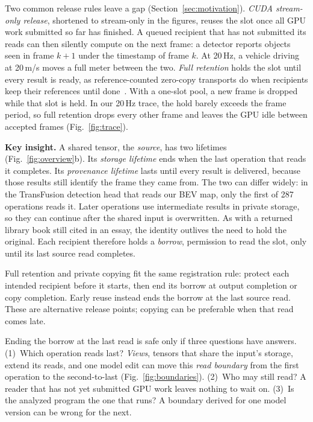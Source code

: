 \documentclass[conference]{IEEEtran}
\newcommand{\Hz}{\,Hz}
\begin{document}
Two common release rules leave a gap (Section~\ref{sec:motivation}). \emph{CUDA stream-only release}, shortened to stream-only in the figures, reuses the slot once all GPU work submitted so far has finished. A queued recipient that has not submitted its reads can then silently compute on the next frame: a detector reports objects seen in frame $k{+}1$ under the timestamp of frame $k$. At 20\Hz, a vehicle driving at 20\,m/s moves a full meter between the two. \emph{Full retention} holds the slot until every result is ready, as reference-counted zero-copy transports do when recipients keep their references until done~\cite{iceoryx,agnocast}. With a one-slot pool, a new frame is dropped while that slot is held. In our 20\Hz{} trace, the hold barely exceeds the frame period, so full retention drops every other frame and leaves the GPU idle between accepted frames (Fig.~\ref{fig:trace}).

\textbf{Key insight.} A shared tensor, the \emph{source}, has two lifetimes (Fig.~\ref{fig:overview}b). Its \emph{storage lifetime} ends when the last operation that reads it completes. Its \emph{provenance lifetime} lasts until every result is delivered, because those results still identify the frame they came from. The two can differ widely: in the TransFusion detection head that reads our BEV map, only the first of 287 operations reads it. Later operations use intermediate results in private storage, so they can continue after the shared input is overwritten. As with a returned library book still cited in an essay, the identity outlives the need to hold the original. Each recipient therefore holds a \emph{borrow}, permission to read the slot, only until its last source read completes.

Full retention and private copying fit the same registration rule: protect each intended recipient before it starts, then end its borrow at output completion or copy completion. Early reuse instead ends the borrow at the last source read. These are alternative release points; copying can be preferable when that read comes late.

Ending the borrow at the last read is safe only if three questions have answers. (1)~Which operation reads last? \emph{Views}, tensors that share the input's storage, extend its reads, and one model edit can move this \emph{read boundary} from the first operation to the second-to-last (Fig.~\ref{fig:boundaries}). (2)~Who may still read? A reader that has not yet submitted GPU work leaves nothing to wait on. (3)~Is the analyzed program the one that runs? A boundary derived for one model version can be wrong for the next.
\end{document}
